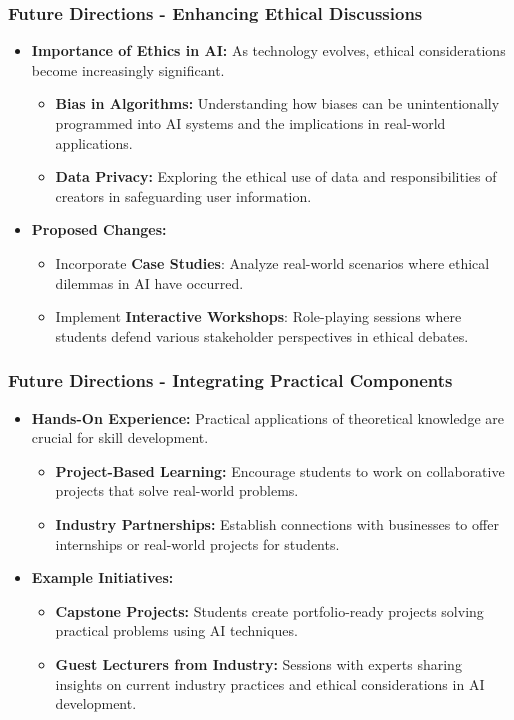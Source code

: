 \documentclass[aspectratio=169]{beamer}
\begin{document}
\begin{frame}[fragile]
    \frametitle{Future Directions - Enhancing Ethical Discussions}
    \begin{itemize}
        \item \textbf{Importance of Ethics in AI:} As technology evolves, ethical considerations become increasingly significant. 
        \begin{itemize}
            \item \textbf{Bias in Algorithms:} Understanding how biases can be unintentionally programmed into AI systems and the implications in real-world applications.
            \item \textbf{Data Privacy:} Exploring the ethical use of data and responsibilities of creators in safeguarding user information.
        \end{itemize}
        \item \textbf{Proposed Changes:}
        \begin{itemize}
            \item Incorporate \textbf{Case Studies}: Analyze real-world scenarios where ethical dilemmas in AI have occurred.
            \item Implement \textbf{Interactive Workshops}: Role-playing sessions where students defend various stakeholder perspectives in ethical debates.
        \end{itemize}
    \end{itemize}
\end{frame}

\begin{frame}[fragile]
    \frametitle{Future Directions - Integrating Practical Components}
    \begin{itemize}
        \item \textbf{Hands-On Experience:} Practical applications of theoretical knowledge are crucial for skill development. 
        \begin{itemize}
            \item \textbf{Project-Based Learning:} Encourage students to work on collaborative projects that solve real-world problems.
            \item \textbf{Industry Partnerships:} Establish connections with businesses to offer internships or real-world projects for students.
        \end{itemize}
        \item \textbf{Example Initiatives:}
        \begin{itemize}
            \item \textbf{Capstone Projects:} Students create portfolio-ready projects solving practical problems using AI techniques.
            \item \textbf{Guest Lecturers from Industry:} Sessions with experts sharing insights on current industry practices and ethical considerations in AI development.
        \end{itemize}
    \end{itemize}
\end{frame}
\end{document}

